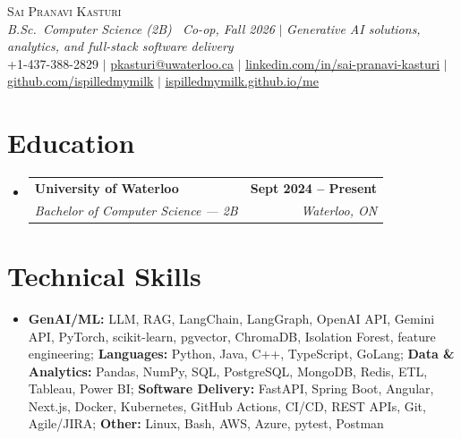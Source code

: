 \documentclass[letterpaper,10pt]{article}
\makeatletter
\newcommand{\resumeSubheading}[4]{
  \vspace{-1pt}\item
    \begin{tabular*}{1.0\textwidth}[t]{l@{\extracolsep{\fill}}r}
      \textbf{#1} & \textbf{\small #2} \\
      \textit{\small#3} & \textit{\small #4} \\[-2pt]
    \end{tabular*}\vspace{-7pt}
}
\newcommand{\resumeSubHeadingListStart}{\begin{itemize}[leftmargin=0.0in, label={}]}
\newcommand{\resumeSubHeadingListEnd}{\end{itemize}}
\makeatother
\begin{document}
\vspace{-20pt}
\begin{center}
    {\Huge \scshape Sai Pranavi Kasturi} \\
    \vspace{1pt}
    \small \textit{B.Sc.\ Computer Science (2B) \textemdash\ Co-op, Fall 2026} $|$ \textit{Generative AI solutions, analytics, and full-stack software delivery} \\
    \vspace{2pt}
    \small +1-437-388-2829 $|$ \underline{pkasturi@uwaterloo.ca} $|$
    \href{https://linkedin.com/in/sai-pranavi-kasturi-704807298}{\underline{linkedin.com/in/sai-pranavi-kasturi}} $|$
    \href{https://github.com/ispilledmymilk}{\underline{github.com/ispilledmymilk}} $|$
    \href{https://ispilledmymilk.github.io/me/}{\underline{ispilledmymilk.github.io/me}}
\end{center}
\vspace{-4pt}

\section{Education}
  \resumeSubHeadingListStart
    \resumeSubheading
      {University of Waterloo}{Sept 2024 -- Present}
      {Bachelor of Computer Science --- 2B}{Waterloo, ON}
  \resumeSubHeadingListEnd
\vspace{-6pt}

\section{Technical Skills}
\begin{itemize}[leftmargin=0.05in, label={}]
  \small\item{
    \textbf{GenAI/ML:} LLM, RAG, LangChain, LangGraph, OpenAI API, Gemini API, PyTorch, scikit-learn, pgvector, ChromaDB, Isolation Forest, feature engineering; \textbf{Languages:} Python, Java, C++, TypeScript, GoLang; \textbf{Data \& Analytics:} Pandas, NumPy, SQL, PostgreSQL, MongoDB, Redis, ETL, Tableau, Power BI; \textbf{Software Delivery:} FastAPI, Spring Boot, Angular, Next.js, Docker, Kubernetes, GitHub Actions, CI/CD, REST APIs, Git, Agile/JIRA; \textbf{Other:} Linux, Bash, AWS, Azure, pytest, Postman
  }
\end{itemize}
\vspace{-6pt}
\end{document}
